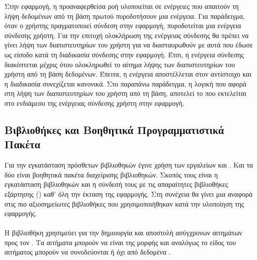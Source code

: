 Στην εφαρμογή, η προαναφερθείσα ροή υλοποιείται σε ενέργειες που απαιτούν τη λήψη δεδομένων από τη βάση πρωτού πυροδοτήσουν μια ενέργεια. Για παράδειγμα, όταν ο χρήστης πραγματοποιεί σύνδεση στην εφαρμογή, πυροδοτείται μια ενέργεια σύνδεσης χρήστη. Για την επιτυχή ολοκλήρωση της ενέργειας σύνδεσης θα πρέπει να γίνει λήψη των διαπιστευτηρίων του χρήστη για να διασταυρωθούν με αυτά που έδωσε ως είσοδο κατά τη διαδικασία σύνδεσης στην εφαρμογή. Έτσι, η ενέργεια σύνδεσης διακόπτεται μέχρις ότου ολοκληρωθεί το αίτημα λήψης των διαπιστευτηρίων του χρήστη από τη βάση δεδομένων. Έπειτα, η ενέργεια αποστέλλεται στον αντίστοιχο  και η διαδικασία συνεχίζεται κανονικά. Στο παραπάνω παράδειγμα, η λογική που αφορά στη λήψη των διαπιστευτηρίων του χρήστη από τη βάση, αποτελεί το  που εκτελείται στο ενδιάμεσο της ενέργειας σύνδεσης χρήστη στην εφαρμογή.



\subsection{Βιβλιοθήκες και Βοηθητικά Προγραμματιστικά Πακέτα}
Για την εγκατάσταση πρόσθετων βιβλιοθηκών έγινε χρήση των εργαλείων  και . Και τα δύο είναι βοηθητικά πακέτα διαχείρισης βιβλιοθηκών. Σκοπός τους είναι η εγκατάσταση βιβλιοθηκών και η σύνδεσή τους με τις απαραίτητες βιβλιοθήκες εξάρτησης () καθ' όλη την έκταση της εφαρμογής.
\newline
\indent
Στη συνέχεια θα γίνει μια αναφορά στις πιο αξιοσημείωτες βιβλιοθήκες που χρησιμοποιήθηκαν κατά την υλοποίηση της εφαρμογής.

\paragraph{}
\paragraph{}
Η βιβλιοθήκη  χρησιμεύει για την δημιουργία και αποστολή ασύγχρονων αιτημάτων προς τον . Τα αιτήματα μπορούν να είναι της μορφής  και αναλόγως το είδος του αιτήματος μπορούν να συνοδεύονται ή όχι από δεδομένα \cite{[AXIOS]}. 


\paragraph{}
